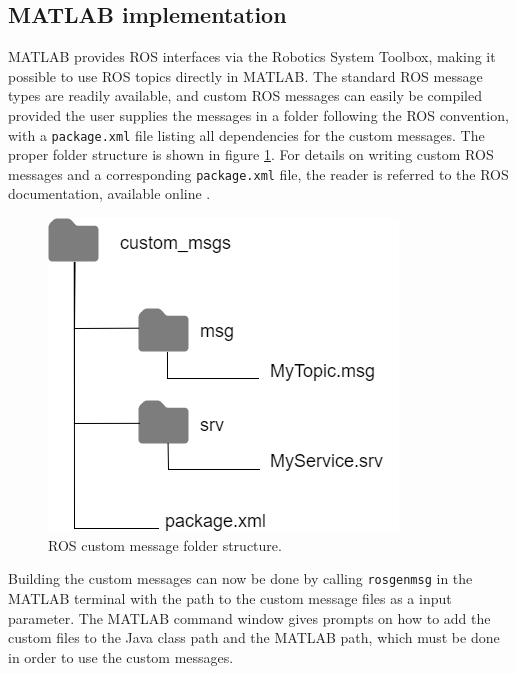 \subsection{MATLAB implementation}
MATLAB provides ROS interfaces via the Robotics System Toolbox, making it possible to use ROS topics directly in MATLAB. The standard ROS message types are readily available, and custom ROS messages can easily be compiled provided the user supplies the messages in a folder following the ROS convention, with a \lstinline[basicstyle=\ttfamily]{package.xml} file listing all dependencies for the custom messages. The proper folder structure is shown in figure \ref{fig:ros_msg_folders}. For details on writing custom ROS messages and a corresponding \lstinline[basicstyle=\ttfamily]{package.xml} file, the reader is referred to the ROS documentation, available online \cite{ros_msgs}.
\begin{figure}[H]
	\centering
	\includegraphics[width=.5\linewidth]{fig/custom_message.png}
	\caption{ROS custom message folder structure.}
	\label{fig:ros_msg_folders}
\end{figure}
Building the custom messages can now be done by calling \lstinline[basicstyle=\ttfamily]{rosgenmsg} in the MATLAB terminal with the path to the custom message files as a input parameter. The MATLAB command window gives prompts on how to add the custom files to the Java class path and the MATLAB path, which must be done in order to use the custom messages.
